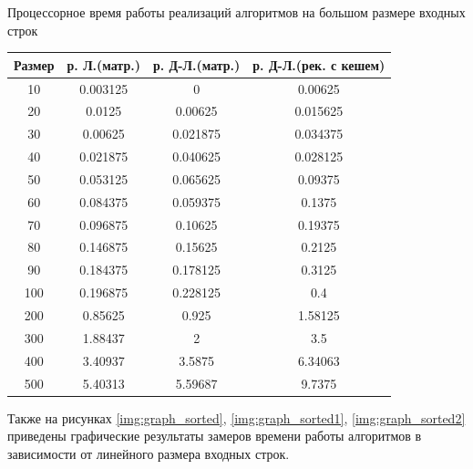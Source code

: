 \begin{center}
	\begin{threeparttable}
		\caption{Процессорное время работы реализаций алгоритмов на большом размере входных строк}
		\label{tbl:best1}
		\begin{tabular}{|c|c|c|c|}
			\hline
			Размер &р. Л.(матр.) &р. Д-Л.(матр.)  &р. Д-Л.(рек. с кешем)\\
			\hline
		 	10  &     0.003125     &         0   &     0.00625 \\
			\hline
			 20   &      0.0125   &     0.00625   &    0.015625 \\
			\hline
			30   &     0.00625   &    0.021875    &   0.034375  \\
			\hline
			40   &    0.021875  &     0.040625    &   0.028125\\
			\hline
			50    &   0.053125  &     0.065625   &     0.09375\\
			\hline
		 	60   &    0.084375  &     0.059375   &      0.1375\\
			\hline
			70    &   0.096875   &     0.10625    &    0.19375 \\
			\hline
			80    &   0.146875    &    0.15625    &     0.2125\\
			\hline
			 90   &    0.184375   &    0.178125   &      0.3125\\
			\hline
			100    &   0.196875   &    0.228125   &         0.4\\
			\hline
			200   &     0.85625    &      0.925   &     1.58125\\
			\hline
			300   &     1.88437    &          2   &         3.5\\
			\hline
			400    &    3.40937     &    3.5875   &     6.34063\\
			\hline
			500     &   5.40313     &   5.59687    &     9.7375\\
			\hline
		\end{tabular}
		
	\end{threeparttable}
\end{center}
Также на рисунках \ref{img:graph_sorted},  \ref{img:graph_sorted1}, \ref{img:graph_sorted2} приведены графические результаты замеров времени работы алгоритмов в зависимости от линейного размера входных строк.

\begin{center}
	\label{img:graph_sorted}
\end{center}

